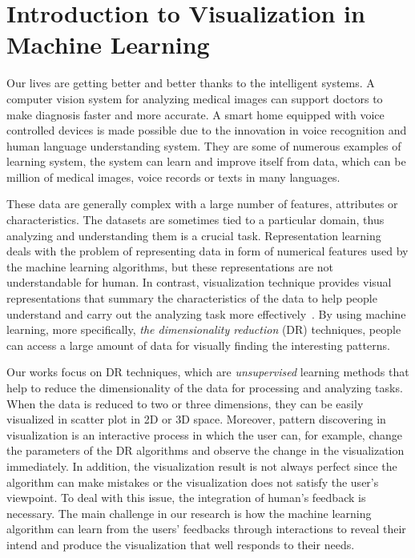 \section{Introduction to Visualization in Machine Learning}

Our lives are getting better and better thanks to the intelligent systems.
A computer vision system for analyzing medical images can support doctors to make diagnosis faster and more accurate.
A smart home equipped with voice controlled devices is made possible due to the innovation in voice recognition and human language understanding system.
They are some of numerous examples of learning system, the system can learn and improve itself from data, which can be million of medical images, voice records or texts in many languages.

These data are generally complex with a large number of features, attributes or characteristics.
The datasets are sometimes tied to a particular domain, thus analyzing and understanding them is a crucial task.
Representation learning~\cite{bengio2013representation} deals with the problem of representing data in form of numerical features used by the machine learning algorithms, but these representations are not understandable for human.
In contrast, visualization technique provides visual representations that summary the characteristics of the data to help people understand and carry out the analyzing task more effectively~\cite{munzner2014visualization}.
By using machine learning, more specifically, \emph{the dimensionality reduction} (DR) techniques, people can access a large amount of data for visually finding the interesting patterns.

Our works focus on DR techniques, which are \emph{unsupervised} learning methods that help to reduce the dimensionality of the data for processing and analyzing tasks.
When the data is reduced to two or three dimensions, they can be easily visualized in scatter plot in 2D or 3D space.
Moreover, pattern discovering in visualization is an interactive process in which the user can, for example, change the parameters of the DR algorithms and observe the change in the visualization immediately.
In addition, the visualization result is not always perfect since the algorithm can make mistakes or the visualization does not satisfy the user's viewpoint. To deal with this issue, the integration of human's feedback is necessary.
The main challenge in our research is how the machine learning algorithm can learn from the users' feedbacks through interactions to reveal their intend and produce the visualization that well responds to their needs.


